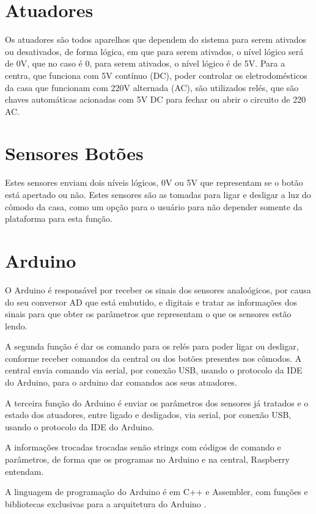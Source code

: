 \section{Atuadores}
\par Os atuadores são todos aparelhos que dependem do sistema para serem ativados ou desativados, de forma lógica, em que para serem ativados, o nível lógico será de 0V, que no caso é 0, para serem ativados, o nível lógico é de 5V. Para a centra, que funciona com 5V contínuo (DC), poder controlar os eletrodomésticos da casa que funcionam com 220V alternada (AC), são utilizados relés, que são chaves automáticas acionadas com 5V DC para fechar ou abrir o circuito de 220 AC.

\section{Sensores Botões}
\par Estes sensores enviam dois níveis lógicos, 0V ou 5V que representam se o botão está apertado ou não. Estes sensores são as tomadas para ligar e desligar a  luz do cômodo da casa, como um opção para o usuário para não depender somente da plataforma para esta função.

\section{Arduino}
\par O Arduino é responsável por receber os sinais dos sensores analoógicos, por causa do seu conversor AD que está embutido, e digitais e tratar as informações dos sinais para que obter os parâmetros que representam o que os sensores estão lendo.
\par A segunda função é dar os comando para os relés para poder ligar ou desligar, conforme receber comandos da central ou dos botões presentes nos cômodos. A central envia comando via serial, por conexão USB, usando o protocolo da IDE do Arduino, para o arduino dar comandos aos seus atuadores.
\par A terceira função do Arduino é enviar os parâmetros dos sensores já tratados e o estado dos atuadores, entre ligado e desligados, via serial, por conexão USB, usando o protocolo da IDE do Arduino.
\par A informações trocadas trocadas senão strings com códigos de comando e parâmetros, de forma que os programas no Arduino e na central, Raspberry entendam.
\par A linguagem de programação do Arduino é em C++ e Assembler, com funções e bibliotecas exclusivas para a arquitetura do Arduino .

